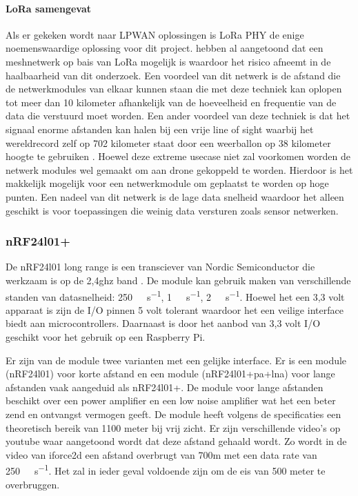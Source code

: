 \documentclass[a4paper, 11pt, oneside]{report}
\begin{document}
\paragraph{LoRa samengevat}
Als er gekeken wordt naar LPWAN oplossingen is LoRa PHY de enige noemenswaardige oplossing voor dit project.
 hebben al aangetoond dat een meshnetwerk op bais van LoRa mogelijk is waardoor het risico afneemt in de haalbaarheid van dit onderzoek.
Een voordeel van dit netwerk is de afstand die de netwerkmodules van elkaar kunnen staan die met deze techniek kan oplopen tot meer dan 10 kilometer afhankelijk van de hoeveelheid en frequentie van de data die verstuurd moet worden.
Een ander voordeel van deze techniek is dat het signaal enorme afstanden kan halen bij een vrije line of sight waarbij het wereldrecord zelf op 702 kilometer staat door een weerballon op 38 kilometer hoogte te gebruiken \cite{LoRARecord}.
Hoewel deze extreme usecase niet zal voorkomen worden de netwerk modules wel gemaakt om aan drone gekoppeld te worden.
Hierdoor is het makkelijk mogelijk voor een netwerkmodule om geplaatst te worden op hoge punten. 
Een nadeel van dit netwerk is de lage data snelheid waardoor het alleen geschikt is voor toepassingen die weinig data versturen zoals sensor netwerken.

\subsubsection{nRF24l01+}\label{sec:nrf24l01}
De nRF24l01 long range is een transciever van Nordic Semiconductor die werkzaam is op de 2,4ghz band \cite{nRFspec}.
De module kan gebruik maken van verschillende standen van datasnelheid: \SI{250}{\kilo\bit\per\second}, \SI{1}{\mega\bit\per\second}, \SI{2}{\mega\bit\per\second}.
Hoewel het een 3,3 volt apparaat is zijn de I/O pinnen 5 volt tolerant waardoor het een veilige interface biedt aan microcontrollers. Daarnaast is door het aanbod van 3,3 volt I/O geschikt voor het gebruik op een Raspberry Pi.

Er zijn van de module twee varianten met een gelijke interface. 
Er is een module (nRF24l01) voor korte afstand en een module (nRF24l01+pa+lna) voor lange afstanden vaak aangeduid als nRF24l01+.
De module voor lange afstanden beschikt over een power amplifier en een low noise amplifier wat het een beter zend en ontvangst vermogen geeft.
De module heeft volgens de specificaties een theoretisch bereik van 1100 meter bij vrij zicht.
Er zijn verschillende video's op youtube waar aangetoond wordt dat deze afstand gehaald wordt.
Zo wordt in de video van iforce2d \citeyear{nrfAfstand} een afstand overbrugt van 700m met een data rate van \SI{250}{\kilo\bit\per\second}.
Het zal in ieder geval voldoende zijn om de eis van 500 meter te overbruggen.  
\end{document}
